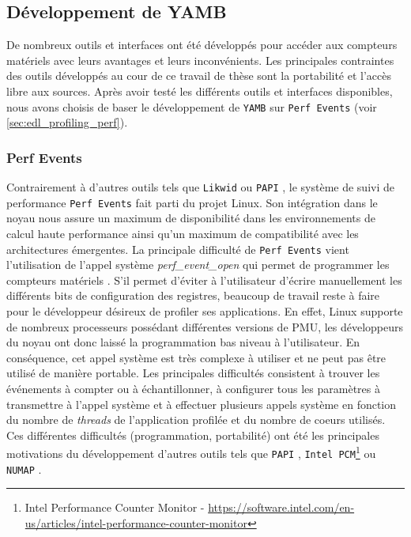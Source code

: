 \subsection{Développement de YAMB}

       De nombreux outils et interfaces ont été développés pour accéder aux compteurs matériels avec leurs avantages et leurs inconvénients. Les principales contraintes des outils développés au cour de ce travail de thèse sont la portabilité et l'accès libre aux sources. Après avoir testé les différents outils et interfaces disponibles, nous avons choisis de baser le développement de \verb|YAMB| sur \texttt{Perf Events} \cite{Weaver2013} (voir \autoref{sec:edl_profiling_perf}).
       
    \subsubsection{Perf Events}
        
            Contrairement à d'autres outils tels que \texttt{Likwid} \cite{Treibig2010} ou \verb=PAPI= \cite{Browne2000}, le système de suivi de performance \texttt{Perf Events} fait parti du projet Linux. Son intégration dans le noyau nous assure un maximum de disponibilité dans les environnements de calcul haute performance ainsi qu'un maximum de compatibilité avec les architectures émergentes.  La principale difficulté de \texttt{Perf Events} vient l'utilisation de l'appel système \textit{perf\_event\_open} qui permet de programmer les compteurs matériels \cite{Selva2017}. S'il permet d'éviter à l'utilisateur d'écrire manuellement les différents bits de configuration des registres, beaucoup de travail reste à faire pour le développeur désireux de profiler ses applications. En effet, Linux supporte de nombreux processeurs possédant différentes versions de PMU, les développeurs du noyau ont donc laissé la programmation bas niveau à l'utilisateur. En conséquence, cet appel système est très complexe à utiliser et ne peut pas être utilisé de manière portable. Les principales difficultés consistent à trouver les événements à compter ou à échantillonner, à configurer tous les paramètres à transmettre à l'appel système et à effectuer plusieurs appels système en fonction du nombre de \textit{threads} de l'application profilée et du nombre de coeurs utilisés. Ces différentes difficultés (programmation, portabilité) ont été les principales motivations du développement d'autres outils tels que \verb=PAPI= \cite{Browne2000}, \verb=Intel PCM=\footnote{Intel Performance Counter Monitor - \url{https://software.intel.com/en-us/articles/intel-performance-counter-monitor}} ou \verb=NUMAP= \cite{Selva2017}.

